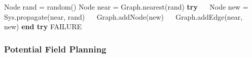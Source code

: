 \begin{itemize}
\begin{itemize}
\begin{itemize}
\begin{algorithmic}
                                \STATE Node rand = random()
                                \STATE Node near = Graph.nearest(rand)
                                \STATE \textbf{try}
                                \STATE $\quad$ Node new = Sys.propagate(near, rand)
                                \STATE $\quad$ Graph.addNode(new)
                                \STATE $\quad$ Graph.addEdge(near, new)
                                \STATE \textbf{end try}
                            \ENDWHILE
                            \RETURN FAILURE
                        \end{algorithmic}
                \end{itemize}
        \end{itemize}
\end{itemize}

\subsubsection{Potential Field Planning}
